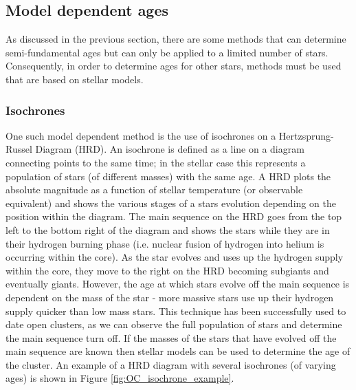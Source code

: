 \subsection{Model dependent ages}
As discussed in the previous section, there are some methods that can determine semi-fundamental ages but can only be applied to a limited number of stars. Consequently, in order to determine ages for other stars, methods must be used that are based on stellar models.

\subsubsection{Isochrones}
One such model dependent method is the use of isochrones on a Hertzsprung-Russel Diagram (HRD). An isochrone is defined as a line on a diagram connecting points to the same time; in the stellar case this represents a population of stars (of different masses) with the same age. A HRD plots the absolute magnitude as a function of stellar temperature (or observable equivalent) and shows the various stages of a stars evolution depending on the position within the diagram. The main sequence on the HRD goes from the top left to the bottom right of the diagram and shows the stars while they are in their hydrogen burning phase (i.e. nuclear fusion of hydrogen into helium is occurring within the core). As the star evolves and uses up the hydrogen supply within the core, they move to the right on the HRD becoming subgiants and eventually giants. However, the age at which stars evolve off the main sequence is dependent on the mass of the star - more massive stars use up their hydrogen supply quicker than low mass stars. This technique has been successfully used to date open clusters, as we can observe the full population of stars and determine the main sequence turn off. If the masses of the stars that have evolved off the main sequence are known then stellar models can be used to determine the age of the cluster. An example of a HRD diagram with several isochrones (of varying ages) is shown in Figure \ref{fig:OC_isochrone_example}.

